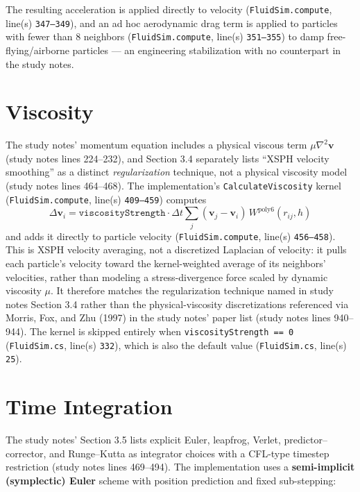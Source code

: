 \documentclass[11pt]{article}
\newcommand{\loc}[2]{\texttt{#1}, line(s) \texttt{#2}}
\begin{document}
The resulting acceleration is applied directly to velocity
(\loc{FluidSim.compute}{347--349}), and an ad hoc aerodynamic drag term is
applied to particles with fewer than 8 neighbors
(\loc{FluidSim.compute}{351--355}) to damp free-flying/airborne particles
--- an engineering stabilization with no counterpart in the study notes.

\section{Viscosity}
\label{sec:viscosity}

The study notes' momentum equation includes a physical viscous term
$\mu\nabla^2\mathbf{v}$ (study notes lines 224--232), and Section 3.4
separately lists ``XSPH velocity smoothing'' as a distinct
\emph{regularization} technique, not a physical viscosity model (study notes
lines 464--468). The implementation's \texttt{CalculateViscosity} kernel
(\loc{FluidSim.compute}{409--459}) computes
\begin{equation*}
    \Delta\mathbf{v}_i = \texttt{viscosityStrength}\cdot\Delta t\sum_j
        (\mathbf{v}_j-\mathbf{v}_i)\,W^{\text{poly6}}(r_{ij},h)
\end{equation*}
and adds it directly to particle velocity (\loc{FluidSim.compute}{456--458}).
This is XSPH velocity averaging, not a discretized Laplacian of velocity: it
pulls each particle's velocity toward the kernel-weighted average of its
neighbors' velocities, rather than modeling a stress-divergence force scaled
by dynamic viscosity $\mu$. It therefore matches the regularization
technique named in study notes Section 3.4 rather than the physical-viscosity
discretizations referenced via Morris, Fox, and Zhu (1997) in the study
notes' paper list (study notes lines 940--944). The kernel is skipped
entirely when \texttt{viscosityStrength == 0} (\loc{FluidSim.cs}{332}), which
is also the default value (\loc{FluidSim.cs}{25}).

\section{Time Integration}
\label{sec:timeintegration}

The study notes' Section 3.5 lists explicit Euler, leapfrog, Verlet,
predictor--corrector, and Runge--Kutta as integrator choices with a CFL-type
timestep restriction (study notes lines 469--494). The implementation uses a
\textbf{semi-implicit (symplectic) Euler} scheme with position prediction and
fixed sub-stepping:
\end{document}
